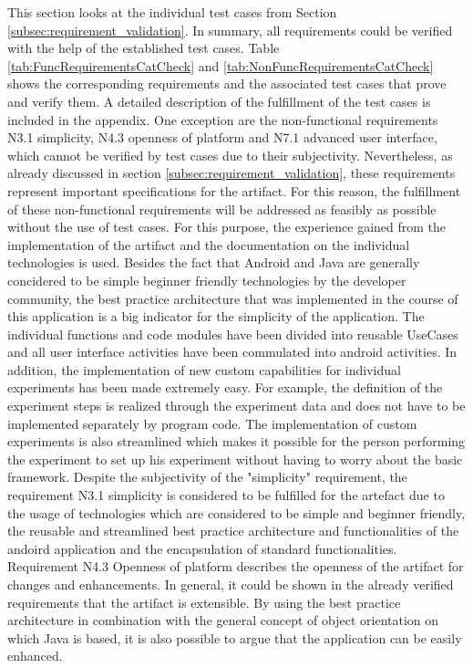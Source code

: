 This section looks at the individual test cases from Section \ref{subsec:requirement_validation}. In summary, all requirements could be verified with the help of the established test cases. Table \ref{tab:FuncRequirementsCatCheck} and \ref{tab:NonFuncRequirementsCatCheck} shows the corresponding requirements and the associated test cases that prove and verify them. A detailed description of the fulfillment of the test cases is included in the appendix. One exception are the non-functional requirements N3.1 simplicity, N4.3 openness of platform and N7.1 advanced user interface, which cannot be verified by test cases due to their subjectivity. Nevertheless, as already discussed in section \ref{subsec:requirement_validation}, these requirements represent important specifications for the artifact. For this reason, the fulfillment of these non-functional requirements will be addressed as feasibly as possible without the use of test cases. For this purpose, the experience gained from the implementation of the artifact and the documentation on the individual technologies is used. Besides the fact that Android and Java are generally concidered to be simple beginner friendly technologies by the developer community, the best practice architecture that was implemented in the course of this application is a big indicator for the simplicity of the application. The individual functions and code modules have been divided into reusable UseCases and all user interface activities have been commulated into android activities. In addition, the implementation of new custom capabilities for individual experiments has been made extremely easy. For example, the definition of the experiment steps is realized through the experiment data and does not have to be implemented separately by program code. The implementation of custom experiments is also streamlined which makes it possible for the person performing the experiment to set up his experiment without having to worry about the basic framework. Despite the subjectivity of the "simplicity" requirement, the requirement N3.1 simplicity is considered to be fulfilled for the artefact due to the usage of technologies which are considered to be simple and beginner friendly, the reusable and streamlined best practice architecture and functionalities of the andoird application and the encapsulation of standard functionalities. 
Requirement N4.3 Openness of platform describes the openness of the artifact for changes and enhancements. In general, it could be shown in the already verified requirements that the artifact is extensible. By using the best practice architecture in combination with the general concept of object orientation on which Java is based, it is also possible to argue that the application can be easily enhanced.
